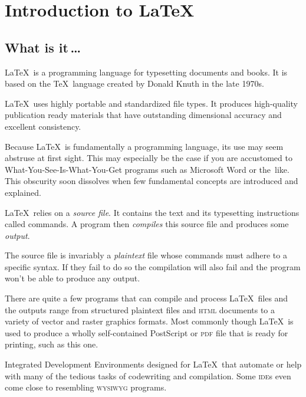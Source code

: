 \documentclass[a4paper,justified]{tufte-handout}
\begin{document}
\section{\hspace*{-15pt}Introduction to \LaTeX}
\subsection{\hspace*{-8pt}What is it\,\dots}

\LaTeX\ is a programming language for typesetting documents and books. It is based on the \TeX\ language created by Donald Knuth in the late 1970s.\label{reasonstouselatex}

\LaTeX\ uses highly portable and standardized file types. It produces high-quality publication ready materials that have outstanding dimensional accuracy and excellent consistency.

Because \LaTeX\ is fundamentally a programming language, its use may seem abstruse at first sight. This may especially be the case if you are accustomed to What-You-See-Is-What-You-Get programs such as Microsoft Word or the~like. This obscurity soon dissolves when few fundamental concepts are introduced and explained.

 \LaTeX\ relies on a \textit{source file}. It contains the text and its typesetting instructions called commands. A program then \textit{compiles} this source file and produces some \textit{output}.

The source file is invariably a \textit{plaintext} file whose commands must adhere to a specific syntax. If they fail to do so the compilation will also fail and the program won't be able to produce any output.

There are quite a few programs that can compile and process \LaTeX\ files and the outputs range from structured plaintext files and \textsc{html} documents to a variety of vector and raster graphics formats. Most commonly though \LaTeX\ is used to produce a wholly self-contained PostScript or \textsc{pdf} file that is ready for printing, such as this one.

 Integrated Development Environments de\-sig\-ned for \LaTeX\ that automate or help with many of the tedious tasks of codewriting and compilation. Some \textsc{ide}s even come close to resembling \textsc{wysiwyg} programs.
\end{document}
